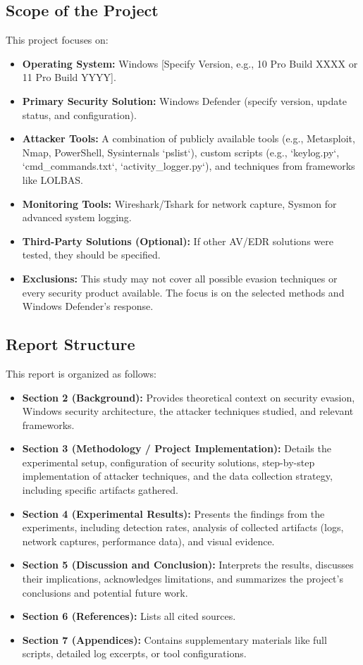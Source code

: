 \documentclass[11pt]{article}
\begin{document}
	\subsection{Scope of the Project}
	This project focuses on:
	\begin{itemize}
		\item \textbf{Operating System:} Windows [Specify Version, e.g., 10 Pro Build XXXX or 11 Pro Build YYYY].
		\item \textbf{Primary Security Solution:} Windows Defender (specify version, update status, and configuration).
		\item \textbf{Attacker Tools:} A combination of publicly available tools (e.g., Metasploit, Nmap, PowerShell, Sysinternals `pslist`), custom scripts (e.g., `keylog.py`, `cmd_commands.txt`, `activity_logger.py`), and techniques from frameworks like LOLBAS.
		\item \textbf{Monitoring Tools:} Wireshark/Tshark for network capture, Sysmon for advanced system logging.
		\item \textbf{Third-Party Solutions (Optional):} If other AV/EDR solutions were tested, they should be specified.
		\item \textbf{Exclusions:} This study may not cover all possible evasion techniques or every security product available. The focus is on the selected methods and Windows Defender's response.
	\end{itemize}
	
	\subsection{Report Structure}
	This report is organized as follows:
	\begin{itemize}
		\item \textbf{Section 2 (Background):} Provides theoretical context on security evasion, Windows security architecture, the attacker techniques studied, and relevant frameworks.
		\item \textbf{Section 3 (Methodology / Project Implementation):} Details the experimental setup, configuration of security solutions, step-by-step implementation of attacker techniques, and the data collection strategy, including specific artifacts gathered.
		\item \textbf{Section 4 (Experimental Results):} Presents the findings from the experiments, including detection rates, analysis of collected artifacts (logs, network captures, performance data), and visual evidence.
		\item \textbf{Section 5 (Discussion and Conclusion):} Interprets the results, discusses their implications, acknowledges limitations, and summarizes the project's conclusions and potential future work.
		\item \textbf{Section 6 (References):} Lists all cited sources.
		\item \textbf{Section 7 (Appendices):} Contains supplementary materials like full scripts, detailed log excerpts, or tool configurations.
	\end{itemize}
	\newpage
	
\end{document}
